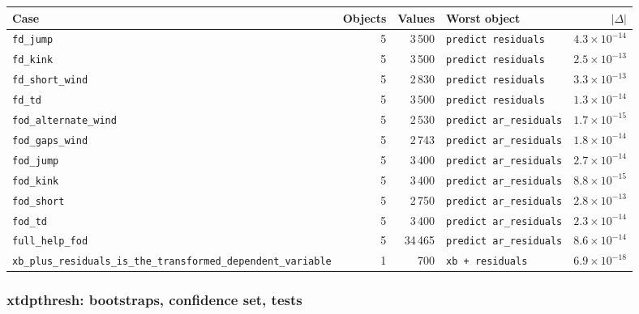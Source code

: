 \begin{longtable}{@{}p{3.6cm}rrp{4.9cm}r@{}}
\toprule
Case & Objects & Values & Worst object & $|\Delta|$ \\
\midrule
\endhead
\texttt{fd\_\allowbreak{}jump} & 5 & 3\,500 & \texttt{predict residuals} & $4.3\times10^{-14}$ \\
\texttt{fd\_\allowbreak{}kink} & 5 & 3\,500 & \texttt{predict residuals} & $2.5\times10^{-13}$ \\
\texttt{fd\_\allowbreak{}short\_\allowbreak{}wind} & 5 & 2\,830 & \texttt{predict residuals} & $3.3\times10^{-13}$ \\
\texttt{fd\_\allowbreak{}td} & 5 & 3\,500 & \texttt{predict residuals} & $1.3\times10^{-14}$ \\
\texttt{fod\_\allowbreak{}alternate\_\allowbreak{}wind} & 5 & 2\,530 & \texttt{predict ar\_\allowbreak{}residuals} & $1.7\times10^{-15}$ \\
\texttt{fod\_\allowbreak{}gaps\_\allowbreak{}wind} & 5 & 2\,743 & \texttt{predict ar\_\allowbreak{}residuals} & $1.8\times10^{-14}$ \\
\texttt{fod\_\allowbreak{}jump} & 5 & 3\,400 & \texttt{predict ar\_\allowbreak{}residuals} & $2.7\times10^{-14}$ \\
\texttt{fod\_\allowbreak{}kink} & 5 & 3\,400 & \texttt{predict ar\_\allowbreak{}residuals} & $8.8\times10^{-15}$ \\
\texttt{fod\_\allowbreak{}short} & 5 & 2\,750 & \texttt{predict ar\_\allowbreak{}residuals} & $2.8\times10^{-13}$ \\
\texttt{fod\_\allowbreak{}td} & 5 & 3\,400 & \texttt{predict ar\_\allowbreak{}residuals} & $2.3\times10^{-14}$ \\
\texttt{full\_\allowbreak{}help\_\allowbreak{}fod} & 5 & 34\,465 & \texttt{predict ar\_\allowbreak{}residuals} & $8.6\times10^{-14}$ \\
\texttt{xb\_\allowbreak{}plus\_\allowbreak{}residuals\_\allowbreak{}is\_\allowbreak{}the\_\allowbreak{}transformed\_\allowbreak{}dependent\_\allowbreak{}variable} & 1 & 700 & \texttt{xb + residuals} & $6.9\times10^{-18}$ \\
\bottomrule
\end{longtable}

\subsubsection*{xtdpthresh: bootstraps, confidence set, tests}

